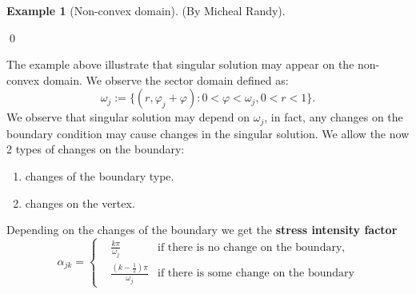 \documentclass[a4paper,12pt,oneside,fleqn]{book}
\theoremstyle{definition}
\newtheorem*{example}{Example}
\theoremstyle{remark}
\begin{document}
\begin{example}[Non-convex domain](By Micheal Randy). 

\qed
\end{example}

The example above illustrate that singular solution may appear on the non-convex domain. We observe the sector domain defined as:
\begin{equation}
	\omega_j:= \{( r, \varphi_j + \varphi): 0 < \varphi < \omega_j, 0 < r < 1 \}. 
\end{equation}
 We observe that singular solution may depend on $\omega_j$, in fact, any changes on the boundary condition may cause changes in the singular solution. We allow the now 2 types of changes on the boundary:
 \begin{enumerate}
 	\item changes of the boundary type.
 	\item changes on the vertex. 
 \end{enumerate}

Depending on the changes of the boundary we get the \textbf{stress intensity factor}
\begin{equation}
	\alpha_{jk} = \left\{
	\begin{aligned}
		& \frac{k\pi}{\omega_j} &\text{if there is no change on the boundary}, \\
		& \frac{(k - \frac{1}{2}) \pi }{\omega_j} & \text{if there is some change on the boundary}
	\end{aligned}
	\right.
\end{equation}
\end{document}

